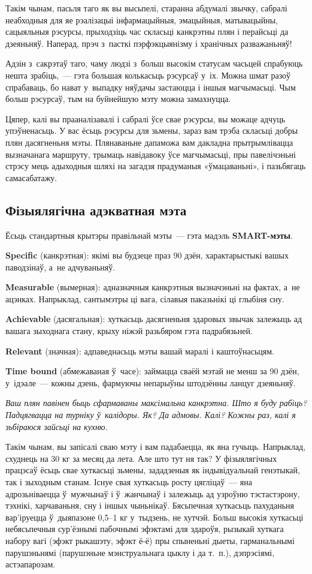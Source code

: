 Такім чынам, пасьля таго як вы высьпелі, старанна абдумалі звычку, сабралі неабходныя для яе рэалізацыі інфармацыйныя, эмацыйныя, матывацыйны, сацыяльныя рэсурсы, прыходзіць час скласьці канкрэтны плян і перайсьці да дзеяньняў. Наперад, прэч з~пасткі пэрфэкцыянізму і хранічных разважаньняў!

Адзін з~сакрэтаў таго, чаму людзі з~больш высокім статусам часьцей спрабуюць нешта зрабіць,~--- гэта большая колькасьць рэсурсаў у~іх. Можна шмат разоў спрабаваць, бо нават у~выпадку няўдачы застаюцца і іншыя магчымасьці. Чым больш рэсурсаў, тым на буйнейшую мэту можна замахнуцца.

Цяпер, калі вы прааналізавалі і сабралі ўсе свае рэсурсы, вы можаце адчуць упэўненасьць. У вас ёсьць рэсурсы для зьмены, зараз вам трэба скласьці добры плян дасягненьня мэты. Плянаваньне дапаможа вам дакладна прытрымлівацца вызначанага маршруту, трымаць навідавоку ўсе магчымасьці, пры павелічэньні стрэсу мець адыходныя шляхі на загадзя прадуманыя «ўмацаваньні», і пазьбягаць самасабатажу.

\subsection*{Фізыялягічна адэкватная мэта}

Ёсьць стандартныя крытэры правільнай мэты~--- гэта мадэль \textbf{SMART-мэты}. 

\textbf{Specific} (канкрэтная): якімі вы будзеце праз 90 дзён, характарыстыкі вашых паводзінаў, а~не адчуваньняў. 

\textbf{Measurable} (вымерная): адназначныя канкрэтныя вызначэньні на фактах, а~не ацэнках. Напрыклад, сантымэтры ці вага, сілавыя паказьнікі ці глыбіня сну. 

\textbf{Achievable} (дасягальная): хуткасьць дасягненьня здаровых звычак залежыць ад вашага зыходнага стану, крыху ніжэй разьбяром гэта падрабязьней. 

\textbf{Relevant} (значная): адпаведнасьць мэты вашай маралі і каштоўнасьцям. 

\textbf{Time bound} (абмежаваная ў~часе): займацца сваёй мэтай не менш за 90 дзён, у~ідэале~--- кожны дзень, фармуючы непарыўны штодзённы ланцуг дзеяньняў. 

\emph{Ваш плян павінен быць сфармаваны максімальна канкрэтна. Што я буду рабіць? Падцягвацца на турніку ў~калідоры. Як? Да адмовы. Калі? Кожны раз, калі я зьбіраюся зайсьці на кухню.}

Такім чынам, вы запісалі сваю мэту і вам падабаецца, як яна гучыць. Напрыклад, схуднець на 30 кг за месяц да лета. Але што тут ня так? У фізыялягічных працэсаў ёсьць свае хуткасьці зьмены, зададзеныя як індывідуальнай генэтыкай, так і зыходным станам. Існуе свая хуткасьць росту цягліцаў~--- яна адрозьніваецца ў~мужчынаў і ў~жанчынаў і залежыць ад узроўню тэстастэрону, тэхнікі, харчаваньня, сну і іншых чыньнікаў. Бясьпечная хуткасьць пахуданьня вар'іруецца ў~дыяпазоне 0,5--1 кг у~тыдзень, не хутчэй. Больш высокія хуткасьці небясьпечныя сур'ёзнымі пабочнымі эфэктамі для здароўя, рызыкай хуткага набору вагі (эфэкт рыкашэту, эфэкт ё-ё) пры спыненьні дыеты, гарманальнымі парушэньнямі (парушэньне мэнструальнага цыклу і да т.~п.), дэпрэсіямі, астэапарозам. 

